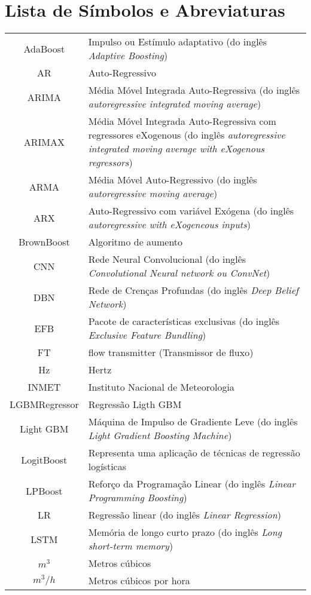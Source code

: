 \section*{Lista de S\'imbolos e Abreviaturas}

\begin{tabular}{cp{}}
	AdaBoost & Impulso ou Estímulo adaptativo (do inglês \textit{Adaptive Boosting}) \\
	AR & Auto-Regressivo\\
	ARIMA & Média Móvel Integrada Auto-Regressiva (do inglês \textit{autoregressive integrated moving average}) \\
	ARIMAX & Média Móvel Integrada Auto-Regressiva com regressores eXogenous (do inglês \textit{autoregressive integrated moving average with eXogenous regressors})\\
	ARMA & Média Móvel Auto-Regressivo (do inglês \textit{autoregressive moving average}) \\
	ARX & Auto-Regressivo com variável Exógena (do inglês \textit{autoregressive with eXogeneous inputs})\\ 
	BrownBoost & Algoritmo de aumento\\
	CNN & Rede Neural Convolucional (do inglês \textit{Convolutional Neural network ou ConvNet})\\
	DBN & Rede de Crenças Profundas (do inglês \textit{Deep Belief Network}) \\
	EFB & Pacote de características exclusivas (do inglês \textit{Exclusive Feature Bundling})\\
	FT & flow transmitter (Transmissor de fluxo)\\
	Hz & Hertz\\
	INMET & Instituto Nacional de Meteorologia\\
	LGBMRegressor & Regressão Ligth GBM\\
	Light GBM & Máquina de Impulso de Gradiente Leve (do inglês \textit{Light Gradient Boosting Machine}) \\
	LogitBoost & Representa uma aplicação de técnicas de regressão logísticas\\
	LPBoost & Reforço da Programação Linear (do inglês \textit{Linear Programming Boosting}) \\
	LR & Regressão linear (do inglês \textit{Linear Regression})\\
	LSTM & Memória de longo curto prazo (do inglês \textit{Long short-term memory})\\
	$m^3$  & Metros cúbicos\\
	$m^3/h$ & Metros cúbicos por hora	
\end{tabular}

